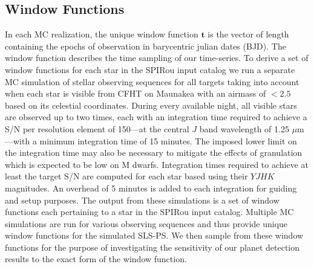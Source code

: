 \subsection{Window Functions} \label{BSsect:wf}
In each MC realization, the unique window function $\mathbf{t}$ is the vector of length \nobs{} containing
the epochs of observation in barycentric julian dates (BJD). The window function describes the time sampling of
our time-series. To derive a set of window functions for each star in the SPIRou input catalog
we run a separate MC simulation of stellar observing sequences for all targets taking into account
when each
star is visible from CFHT on Maunakea with an airmass of $<2.5$ based on its celestial coordinates.
During every available night, all visible stars are observed up to two times,
each with an integration time required to achieve a
S/N per resolution element of 150---at the central $J$ band wavelength of 1.25 $\mu$m---with a minimum integration
time of 15 minutes. The imposed lower limit on the
integration time may also be necessary to mitigate the effects of granulation \citep{lovis05} which is
expected to be low on M dwarfs. 
Integration times required to achieve at least the target S/N are computed for
each star based using their $YJHK$ magnitudes. An overhead of 5 minutes is added to each
integration for guiding and setup purposes.
The output from these simulations is a set of window functions each pertaining to a star in the
SPIRou input catalog. Multiple MC simulations are run for various observing
sequences and thus provide unique window functions for the simulated SLS-PS. We then sample from
these window functions for the purpose of investigating
the sensitivity of our planet detection results to the exact form of the window function. \\

